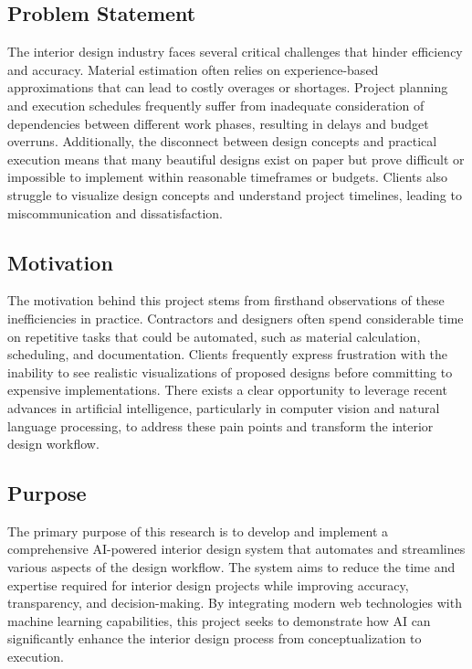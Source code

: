 \documentclass[conference]{IEEEtran}
\begin{document}
\subsection{Problem Statement}
The interior design industry faces several critical challenges that hinder efficiency and accuracy. Material estimation often relies on experience-based approximations that can lead to costly overages or shortages. Project planning and execution schedules frequently suffer from inadequate consideration of dependencies between different work phases, resulting in delays and budget overruns. Additionally, the disconnect between design concepts and practical execution means that many beautiful designs exist on paper but prove difficult or impossible to implement within reasonable timeframes or budgets. Clients also struggle to visualize design concepts and understand project timelines, leading to miscommunication and dissatisfaction.

\subsection{Motivation}
The motivation behind this project stems from firsthand observations of these inefficiencies in practice. Contractors and designers often spend considerable time on repetitive tasks that could be automated, such as material calculation, scheduling, and documentation. Clients frequently express frustration with the inability to see realistic visualizations of proposed designs before committing to expensive implementations. There exists a clear opportunity to leverage recent advances in artificial intelligence, particularly in computer vision and natural language processing, to address these pain points and transform the interior design workflow.

\subsection{Purpose}
The primary purpose of this research is to develop and implement a comprehensive AI-powered interior design system that automates and streamlines various aspects of the design workflow. The system aims to reduce the time and expertise required for interior design projects while improving accuracy, transparency, and decision-making. By integrating modern web technologies with machine learning capabilities, this project seeks to demonstrate how AI can significantly enhance the interior design process from conceptualization to execution.
\end{document}
